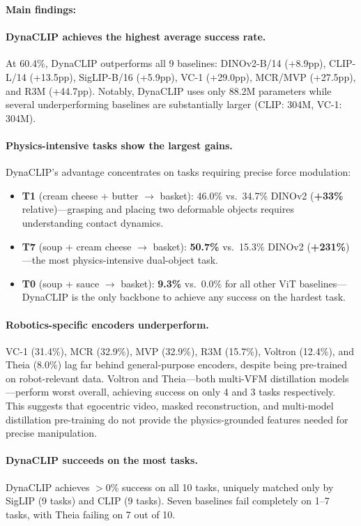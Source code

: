 \documentclass{article}
\newcommand{\methodname}{DynaCLIP}
\newcommand{\best}[1]{\textbf{#1}}
\begin{document}
\textbf{Main findings:}

\paragraph{DynaCLIP achieves the highest average success rate.} At 60.4\%, \methodname{} outperforms all 9 baselines: DINOv2-B/14 (+8.9pp), CLIP-L/14 (+13.5pp), SigLIP-B/16 (+5.9pp), VC-1 (+29.0pp), MCR/MVP (+27.5pp), and R3M (+44.7pp). Notably, \methodname{} uses only 88.2M parameters while several underperforming baselines are substantially larger (CLIP: 304M, VC-1: 304M).

\paragraph{Physics-intensive tasks show the largest gains.} \methodname{}'s advantage concentrates on tasks requiring precise force modulation:
\begin{itemize}[leftmargin=*,itemsep=0pt,topsep=2pt]
    \item \textbf{T1} (cream cheese + butter $\to$ basket): 46.0\% vs.\ 34.7\% DINOv2 (\textbf{+33\%} relative)---grasping and placing two deformable objects requires understanding contact dynamics.
    \item \textbf{T7} (soup + cream cheese $\to$ basket): \best{50.7\%} vs.\ 15.3\% DINOv2 (\textbf{+231\%})---the most physics-intensive dual-object task.
    \item \textbf{T0} (soup + sauce $\to$ basket): \best{9.3\%} vs.\ 0.0\% for all other ViT baselines---\methodname{} is the only backbone to achieve any success on the hardest task.
\end{itemize}

\paragraph{Robotics-specific encoders underperform.} VC-1 (31.4\%), MCR (32.9\%), MVP (32.9\%), R3M (15.7\%), Voltron (12.4\%), and Theia (8.0\%) lag far behind general-purpose encoders, despite being pre-trained on robot-relevant data. Voltron and Theia---both multi-VFM distillation models---perform worst overall, achieving success on only 4 and 3 tasks respectively. This suggests that egocentric video, masked reconstruction, and multi-model distillation pre-training do not provide the physics-grounded features needed for precise manipulation.

\paragraph{DynaCLIP succeeds on the most tasks.} \methodname{} achieves $>$0\% success on all 10 tasks, uniquely matched only by SigLIP (9 tasks) and CLIP (9 tasks). Seven baselines fail completely on 1--7 tasks, with Theia failing on 7 out of 10.
\end{document}
